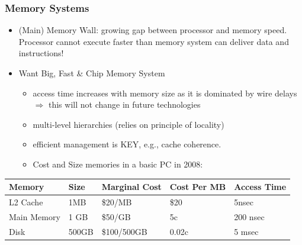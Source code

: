 \documentclass{beamer}
\newcommand{\emp}[1]{\textcolor{DikuRed}{ #1}}
\begin{document}
\begin{frame}[fragile,t]
\frametitle{Memory Systems}

\begin{itemize}
    \item \emp{(Main) Memory Wall:} growing gap between processor and memory speed.
            Processor cannot execute faster than memory system can deliver data 
            and instructions!\bigskip

    \item Want Big, Fast \& Chip Memory System\smallskip
    \begin{itemize}
        \item access time 
                increases with memory size as it is dominated by 
                wire delays$\Rightarrow$ this will not change in future technologies\smallskip
        \item multi-level hierarchies (relies on principle of locality)\smallskip
        \item efficient management is KEY, e.g., cache coherence.\smallskip
        \item Cost and Size memories in a basic PC in 2008:
    \end  {itemize} 
\end{itemize}
\bigskip

\begin{tabular}{|l|l|l|l|l|}\hline
Memory & Size  & Marginal Cost & Cost Per MB & Access Time \\\hline
L2 Cache & 1MB & \$20/MB & \$20 & 5nsec \\\hline
Main Memory & 1 GB & \$50/GB & 5c & 200 nsec \\\hline
Disk & 500GB & \$100/500GB & 0.02c & 5 msec \\\hline
\end{tabular}

\end{frame}
\end{document}
